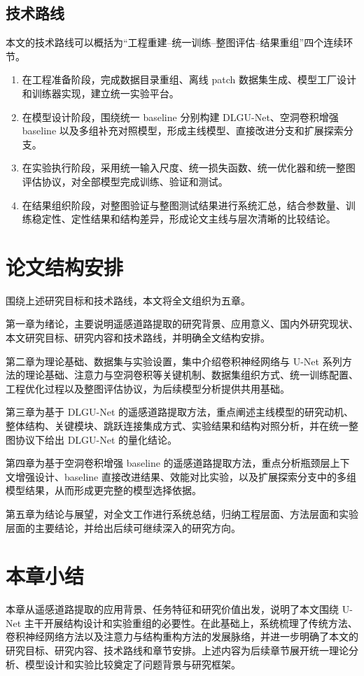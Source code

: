 \subsection{技术路线}
本文的技术路线可以概括为“工程重建--统一训练--整图评估--结果重组”四个连续环节。

\begin{enumerate}
  \item 在工程准备阶段，完成数据目录重组、离线 patch 数据集生成、模型工厂设计和训练器实现，建立统一实验平台。
  \item 在模型设计阶段，围绕统一 baseline 分别构建 DLGU-Net、空洞卷积增强 baseline 以及多组补充对照模型，形成主线模型、直接改进分支和扩展探索分支。
  \item 在实验执行阶段，采用统一输入尺度、统一损失函数、统一优化器和统一整图评估协议，对全部模型完成训练、验证和测试。
  \item 在结果组织阶段，对整图验证与整图测试结果进行系统汇总，结合参数量、训练稳定性、定性结果和结构差异，形成论文主线与层次清晰的比较结论。
\end{enumerate}

\section{论文结构安排}
围绕上述研究目标和技术路线，本文将全文组织为五章。

第一章为绪论，主要说明遥感道路提取的研究背景、应用意义、国内外研究现状、本文研究目标、研究内容和技术路线，并明确全文结构安排。

第二章为理论基础、数据集与实验设置，集中介绍卷积神经网络与 U-Net 系列方法的理论基础、注意力与空洞卷积等关键机制、数据集组织方式、统一训练配置、工程优化过程以及整图评估协议，为后续模型分析提供共用基础。

第三章为基于 DLGU-Net 的遥感道路提取方法，重点阐述主线模型的研究动机、整体结构、关键模块、跳跃连接集成方式、实验结果和结构对照分析，并在统一整图协议下给出 DLGU-Net 的量化结论。

第四章为基于空洞卷积增强 baseline 的遥感道路提取方法，重点分析瓶颈层上下文增强设计、baseline 直接改进结果、效能对比实验，以及扩展探索分支中的多组模型结果，从而形成更完整的模型选择依据。

第五章为结论与展望，对全文工作进行系统总结，归纳工程层面、方法层面和实验层面的主要结论，并给出后续可继续深入的研究方向。

\section{本章小结}
本章从遥感道路提取的应用背景、任务特征和研究价值出发，说明了本文围绕 U-Net 主干开展结构设计和实验重组的必要性。在此基础上，系统梳理了传统方法、卷积神经网络方法以及注意力与结构重构方法的发展脉络，并进一步明确了本文的研究目标、研究内容、技术路线和章节安排。上述内容为后续章节展开统一理论分析、模型设计和实验比较奠定了问题背景与研究框架。
